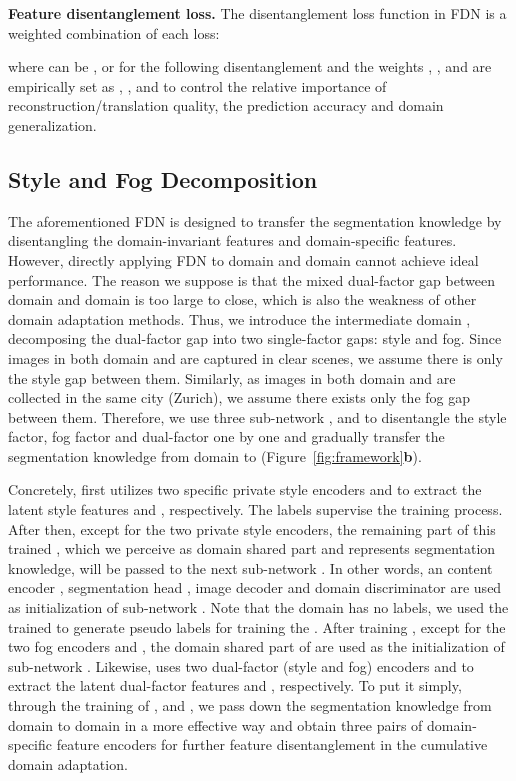 \documentclass[10pt,twocolumn,letterpaper]{article}
\newcommand{\heading}[1]{\noindent\textbf{#1}}
\begin{document}
\heading{Feature disentanglement loss.}
The disentanglement loss function in FDN is a weighted combination of each loss:

where  can be ,  or  for the following disentanglement and the weights , ,  and  are empirically set as , ,  and  to control the relative importance of reconstruction/translation quality, the prediction accuracy and domain generalization.


\subsection{Style and Fog Decomposition}








The aforementioned FDN is designed to transfer the segmentation knowledge by disentangling the domain-invariant features and domain-specific features. 
However, directly applying FDN to domain  and domain  cannot achieve ideal performance.
The reason we suppose is that the mixed dual-factor gap between domain  and domain  is too large to close, which is also the weakness of other domain adaptation methods. 
Thus, we introduce the intermediate domain , decomposing the dual-factor gap into two single-factor gaps: style and fog. Since images in both domain  and  are captured in clear scenes, we assume there is only the style gap between them. Similarly, as images in both domain  and  are collected in the same city (Zurich), we assume there exists only the fog gap between them. Therefore, we use three sub-network ,  and  to disentangle the style factor, fog factor and dual-factor one by one and gradually transfer the segmentation knowledge from domain  to  (Figure~\ref{fig:framework}\textbf{b}).

Concretely,  first utilizes two specific private style encoders  and  to extract the latent style features  and , respectively. 
The labels  supervise the training process.
After then, 
except for the two private style encoders, the remaining part of this trained , which we perceive as domain shared part and represents segmentation knowledge, will be passed to the next sub-network . In other words, an content encoder , segmentation head , image decoder  and domain discriminator  are used as initialization of sub-network . Note that the domain  has no labels, we used the trained  to generate pseudo labels for training the . After training , except for the two fog encoders  and , the domain shared part of   are used as the initialization of sub-network . Likewise,   uses two dual-factor (style and fog) encoders  and  to extract the latent dual-factor features  and , respectively. 
To put it simply, through the training of ,  and , we pass down the segmentation knowledge from domain  to domain  in a more effective way and obtain three pairs of domain-specific feature encoders for further feature disentanglement in the cumulative domain adaptation.
\end{document}
